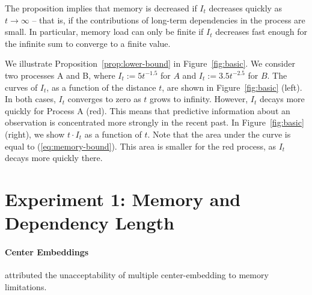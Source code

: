 \documentclass[11pt,letterpaper]{article}
\begin{document}
The proposition implies that memory is decreased if $I_t$ decreases quickly as $t \rightarrow \infty$ -- that is, if the contributions of long-term dependencies in the process are small.
In particular, memory load can only be finite if $I_t$ decreases fast enough for the infinite sum to converge to a finite value.





We illustrate Proposition~\ref{prop:lower-bound} in Figure~\ref{fig:basic}.
We consider two processes A and B, where $I_t := 5t^{-1.5}$ for $A$ and $I_t := 3.5 t^{-2.5}$ for $B$.
The curves of $I_t$, as a function of the distance $t$, are shown in Figure~\ref{fig:basic} (left).
In both cases, $I_t$ converges to zero as $t$ grows to infinity. 
However, $I_t$ decays more quickly for Process A (red).
This means that predictive information about an observation is concentrated more strongly in the recent past.
In Figure~\ref{fig:basic} (right), we show $t\cdot I_t$ as a function of $t$.
Note that the area under the curve is equal to (\ref{eq:memory-bound}).
This area is smaller for the red process, as $I_t$ decays more quickly there.  


\section{Experiment 1: Memory and Dependency Length}





\paragraph{Center Embeddings}

\cite{miller-finitary-1963} attributed the unacceptability of multiple center-embedding to memory limitations.
\end{document}
